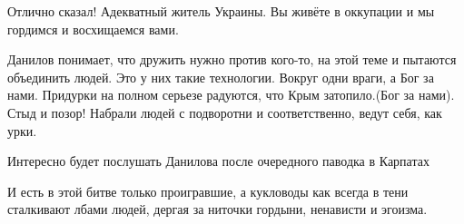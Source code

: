 \begin{itemize}
\begin{itemize}
\end{itemize}


Отлично сказал! Адекватный житель Украины. Вы живёте в оккупации и мы гордимся
и восхищаемся вами.


Данилов понимает, что дружить нужно против кого-то, на этой теме и пытаются
объединить людей. Это у них такие технологии. Вокруг одни враги, а Бог за нами.
Придурки на полном серьезе радуются, что Крым затопило.(Бог за нами). Стыд и
позор! Набрали людей с подворотни и соответственно, ведут себя, как урки.

Интересно будет послушать Данилова после очередного паводка в Карпатах

И есть в этой битве только проигравшие, а кукловоды как всегда в тени
сталкивают лбами людей, дергая за ниточки гордыни, ненависти и эгоизма.

\end{itemize}
